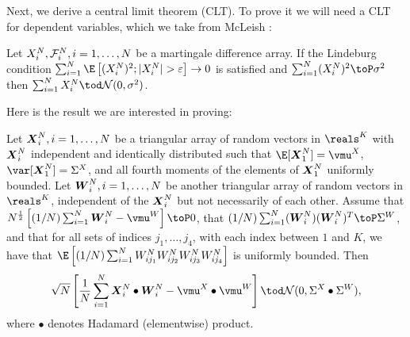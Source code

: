 Next, we derive a central limit theorem (CLT).  To prove it we will need a
CLT for dependent variables, which we take from McLeish \cite{mcleish1974dcl}:

\begin{lemma}[McLeish]\label{L:mcleigh}
    Let $X^N_i, \mathcal{F}^N_i, i = 1, \ldots, N$ be a martingale difference array.  If
    the Lindeburg condition 
    $\sum_{i=1}^N \E \left[ (X^N_i)^2 ; | X^N_i | > \varepsilon \right] \to 0$
    is satisfied and $\sum_{i=1}^N (X^N_i)^2 \toP \sigma^2$ then
    $\sum_{i=1}^N X^N_i \tod \N (0, \sigma^2)$.
\end{lemma}

Here is the result we are interested in proving:

\begin{lemma}\label{L:clt-weighted}
    Let $\boldsymbol{X}_i^N, i = 1, \ldots, N$ be a triangular array of random vectors
    in $\reals^K$ with $\boldsymbol{X}_i^N$ independent and identically distributed such that
    $\E[ \bX_1^N ] = \vmu^X$, $\var[ \bX_1^N] = \Sigma^X$, and all fourth
    moments of the elements of $\boldsymbol{X}_1^N$ uniformly bounded.  Let 
    $\boldsymbol{W}_i^N, i = 1, \ldots, N$ be another triangular array of random vectors
    in $\reals^K$, independent of the $\boldsymbol{X}_i^N$ but not necessarily of each
    other.  Assume that 
    $N^\half \left[ (1/N) \sum_{i=1}^N \bW_i^N - \vmu^W \right] \toP 0$, that
    $(1/N) \sum_{i=1}^N (\bW_i^N)(\bW_i^N)^T \toP \Sigma^W$, and that for
    all sets of indices $j_1, \ldots, j_4$, with each index between $1$ and
    $K$, we have that
    \(
        \E \left[ 
            (1/N) 
            \sum_{i=1}^N
                W^N_{ij_1} 
                W^N_{ij_2} 
                W^N_{ij_3} 
                W^N_{ij_4} 
        \right]
    \) is uniformly bounded.  Then
    \[
        \sqrt{N}
        \left[
            \frac{1}{N}
            \sum_{i=1}^N
                \bX_i^N \bullet \bW_i^N
            -
            \vmu^X \bullet \vmu^W
        \right]
        \tod
        \N( 0, \Sigma^X \bullet \Sigma^W),
    \]
    where $\bullet$ denotes Hadamard (elementwise) product.
\end{lemma}
